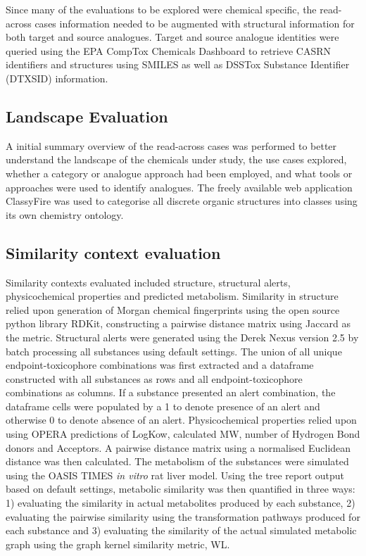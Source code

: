 \documentclass[
  super,
  preprint,
  3p]{elsarticle}
\begin{document}
Since many of the evaluations to be explored were chemical specific, the
read-across cases information needed to be augmented with structural
information for both target and source analogues. Target and source
analogue identities were queried using the EPA CompTox Chemicals
Dashboard to retrieve CASRN identifiers and structures using SMILES as
well as DSSTox Substance Identifier (DTXSID) information.

\subsection{Landscape Evaluation}\label{landscape-evaluation}

A initial summary overview of the read-across cases was performed to
better understand the landscape of the chemicals under study, the use
cases explored, whether a category or analogue approach had been
employed, and what tools or approaches were used to identify analogues.
The freely available web application ClassyFire was used to categorise
all discrete organic structures into classes using its own chemistry
ontology.

\subsection{Similarity context
evaluation}\label{similarity-context-evaluation}

Similarity contexts evaluated included structure, structural alerts,
physicochemical properties and predicted metabolism. Similarity in
structure relied upon generation of Morgan chemical fingerprints using
the open source python library RDKit, constructing a pairwise distance
matrix using Jaccard as the metric. Structural alerts were generated
using the Derek Nexus version 2.5 by batch processing all substances
using default settings. The union of all unique endpoint-toxicophore
combinations was first extracted and a dataframe constructed with all
substances as rows and all endpoint-toxicophore combinations as columns.
If a substance presented an alert combination, the dataframe cells were
populated by a 1 to denote presence of an alert and otherwise 0 to
denote absence of an alert. Physicochemical properties relied upon using
OPERA predictions of LogKow, calculated MW, number of Hydrogen Bond
donors and Acceptors. A pairwise distance matrix using a normalised
Euclidean distance was then calculated. The metabolism of the substances
were simulated using the OASIS TIMES \emph{in vitro} rat liver model.
Using the tree report output based on default settings, metabolic
similarity was then quantified in three ways: 1) evaluating the
similarity in actual metabolites produced by each substance, 2)
evaluating the pairwise similarity using the transformation pathways
produced for each substance and 3) evaluating the similarity of the
actual simulated metabolic graph using the graph kernel similarity
metric, WL.
\end{document}

